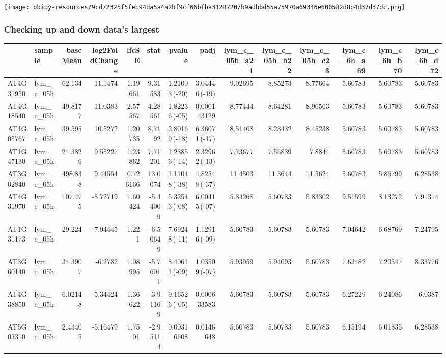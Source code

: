 \documentclass[a4paper]{article}
\begin{document}
\begin{center}
\texttt{[image: obipy-resources/9cd72325f5feb94da5a4a2bf9cf66bfba3128720/b9adbbd55a75970a69346e600582d8b4d37d37dc.png]}
\end{center}


\subsubsection{Checking up and down data's largest}
\label{sec:org5d34bc6}

\begin{center}
\begin{tabular}{llrrrrrrrrrrrr}
 & sample & baseMean & log2FoldChange & lfcSE & stat & pvalue & padj & lym\_c\_05h\_a21 & lym\_c\_05h\_b22 & lym\_c\_05h\_c23 & lym\_c\_6h\_a69 & lym\_c\_6h\_b70 & lym\_c\_6h\_d72\\
\hline
AT4G31950 & lym\_c\_05h & 62.134 & 11.1474 & 1.19661 & 9.31583 & 1.21003\,(-20) & 3.04446\,(-19) & 9.02695 & 8.85273 & 8.77664 & 5.60783 & 5.60783 & 5.60783\\
AT4G18540 & lym\_c\_05h & 49.8177 & 11.0383 & 2.57567 & 4.28561 & 1.82236\,(-05) & 0.000143129 & 8.77444 & 8.64281 & 8.96563 & 5.60783 & 5.60783 & 5.60783\\
AT1G05767 & lym\_c\_05h & 39.595 & 10.5272 & 1.20735 & 8.7192 & 2.80169\,(-18) & 6.36071\,(-17) & 8.51408 & 8.23432 & 8.45238 & 5.60783 & 5.60783 & 5.60783\\
AT1G47130 & lym\_c\_05h & 24.3826 & 9.55227 & 1.23862 & 7.71201 & 1.23856\,(-14) & 2.32962\,(-13) & 7.73677 & 7.55839 & 7.8844 & 5.60783 & 5.60783 & 5.60783\\
AT3G02840 & lym\_c\_05h & 498.838 & 9.44554 & 0.726166 & 13.0074 & 1.11048\,(-38) & 4.82548\,(-37) & 11.4503 & 11.3644 & 11.5624 & 5.60783 & 5.86799 & 6.28538\\
AT4G31970 & lym\_c\_05h & 107.475 & -8.72719 & 1.60424 & -5.44009 & 5.32543\,(-08) & 6.00415\,(-07) & 5.84268 & 5.60783 & 5.83302 & 9.51599 & 8.13272 & 7.91314\\
AT1G31173 & lym\_c\_05h & 29.224 & -7.94445 & 1.221 & -6.50649 & 7.69248\,(-11) & 1.12916\,(-09) & 5.60783 & 5.60783 & 5.60783 & 7.04642 & 6.68769 & 7.24795\\
AT3G60140 & lym\_c\_05h & 34.3907 & -6.2782 & 1.08995 & -5.76011 & 8.40611\,(-09) & 1.03509\,(-07) & 5.93959 & 5.94093 & 5.60783 & 7.63482 & 7.20347 & 8.33776\\
AT4G38850 & lym\_c\_05h & 6.02148 & -5.34424 & 1.36622 & -3.91169 & 9.16526\,(-05) & 0.000633583 & 5.60783 & 5.60783 & 5.60783 & 6.27229 & 6.24086 & 6.0387\\
AT5G03310 & lym\_c\_05h & 2.43405 & -5.16479 & 1.7501 & -2.95114 & 0.00316608 & 0.0146648 & 5.60783 & 5.60783 & 5.60783 & 6.15194 & 6.01835 & 6.28538\\
\end{tabular}
\end{center}
\end{document}
